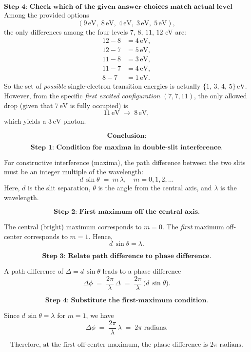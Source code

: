 \documentclass[12pt]{article}
\theoremstyle{definition} %
\theoremstyle{plain} %
\begin{document}
\[
\textbf{Step 4: Check which of the given answer-choices match actual level differences.}
\]
Among the provided options 
\[
(9\,\mathrm{eV},\; 8\,\mathrm{eV},\; 4\,\mathrm{eV},\; 3\,\mathrm{eV},\; 5\,\mathrm{eV}),
\]
the only differences among the four levels $7,\,8,\,11,\,12$ eV are:
\[
\begin{aligned}
12 - 8 &= 4\,\mathrm{eV}, \\
12 - 7 &= 5\,\mathrm{eV}, \\
11 - 8 &= 3\,\mathrm{eV}, \\
11 - 7 &= 4\,\mathrm{eV}, \\
8 - 7  &= 1\,\mathrm{eV}.
\end{aligned}
\]
So the set of \emph{possible} single-electron transition energies is actually $\{1,\,3,\,4,\,5\}\,\mathrm{eV}.$  However, from the specific \emph{first excited configuration} $(7,7,11)$, the only allowed drop (given that $7\,\mathrm{eV}$ is fully occupied) is
\[
11\,\mathrm{eV} \;\to\; 8\,\mathrm{eV},
\]
which yields a $3\,\mathrm{eV}$ photon.

\[
\textbf{Conclusion:}
\]

\[
\textbf{Step 1: Condition for maxima in double-slit interference.}
\]

For constructive interference (maxima), the path difference between the two slits must be an integer multiple of the wavelength:
\[
d \,\sin \theta \;=\; m \,\lambda, 
\quad m = 0, 1, 2, \ldots
\]
Here, \(d\) is the slit separation, \(\theta\) is the angle from the central axis, and \(\lambda\) is the wavelength.

\[
\textbf{Step 2: First maximum off the central axis.}
\]

The central (bright) maximum corresponds to \(m=0\). 
The \emph{first} maximum off-center corresponds to \(m = 1\). 
Hence,
\[
d \,\sin \theta = \lambda.
\]

\[
\textbf{Step 3: Relate path difference to phase difference.}
\]

A path difference of \(\Delta = d \,\sin \theta\) leads to a phase difference 
\[
\Delta \phi 
\;=\; \frac{2\pi}{\lambda}\,\Delta 
\;=\; \frac{2\pi}{\lambda}\,\bigl(d \,\sin \theta\bigr).
\]

\[
\textbf{Step 4: Substitute the first-maximum condition.}
\]

Since \(d \,\sin \theta = \lambda\) for \(m=1\), we have
\[
\Delta \phi 
\;=\; \frac{2\pi}{\lambda} \,\lambda
\;=\; 2\pi \text{ radians.}
\]

\[
\boxed{\text{Therefore, at the first off-center maximum, the phase difference is }2\pi\text{ radians.}}
\] 
\end{document}
